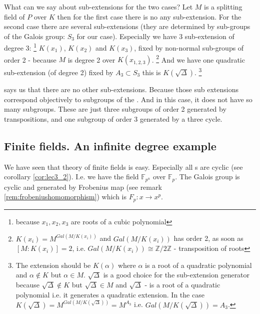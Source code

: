 \begin{example}
  What can we say about sub-extensions for the two cases? Let $M$ is a
  splitting field of $P$ over $K$ then for the first case there is no
  any sub-extension. For the second case there are several
  sub-extensions (they are determined by sub-groups of the Galois
  group: $S_3$ for our case). Especially we have 3 sub-extension of
  degree 3:
  \footnote{
    because $x_1, x_2, x_3$ are roots of a cubic polynomial
  }
  $K\left(x_1\right)$, $K\left(x_2\right)$ and
  $K\left(x_3\right)$, fixed by non-normal sub-groups of order 2 -
  because $M$ is degree 2 over $K\left(x_{1,2,3}\right)$.
  \footnote{
    $K\left(x_i\right) = M^{Gal\left(M/K\left(x_i\right)\right)}$ and
    $Gal\left(M/K\left(x_i\right)\right)$ has order 2, as soon as
    $\left[M:K\left(x_i\right)\right] = 2$,
    i.e.
    $Gal\left(M/K\left(x_i\right)\right) \cong \mathbb{Z}/2\mathbb{Z}$
    - transposition of roots
  }
  And we have
  one quadratic sub-extension 
  (of degree 2) fixed by $A_3 \subset S_3$ this is
  $K\left(\sqrt{\Delta}\right)$.
  \footnote{
    The extension should be $K\left(\alpha\right)$ where $\alpha$ is a
    root of a quadratic polynomial and $\alpha \notin
    K$ but $\alpha \in M$. $\sqrt{\Delta}$ is a good choice for the
    sub-extension 
    generator because $\sqrt{\Delta} \notin K$ but $\sqrt{\Delta} \in
    M$ and $\sqrt{\Delta}$ - is a root of a quadratic polynomial
    i.e. it generates a quadratic extension. In the case
    $K\left(\sqrt{\Delta}\right) =
    M^{Gal\left(M/K\left(\sqrt{\Delta}\right)\right)} = M^{A_3}$ i.e.
    $Gal\left(M/K\left(\sqrt{\Delta}\right)\right) = A_3$.
  }

   says us that there are no other
  sub-extensions. Because those sub extensions correspond objectively
  to subgroups of the . And in this case, it
  does not have so many subgroups. These are just three subgroups of order 2
  generated by transpositions, and one subgroup of order 3 generated
  by a three cycle.  
  \label{ex:lec6_discriminant3degree}
\end{example}

\subsection{Finite fields. An infinite degree example}
\label{sec:lec6_finitefield}
We have seen that theory of finite fields is easy. Especially all
s are cyclic (see corollary
\ref{cor:lec3_2}). I.e. we have the field $\mathbb{F}_{p^n}$ over
$\mathbb{F}_{p}$. The Galois group is cyclic and generated by
Frobenius map (see remark \ref{rem:frobeniushomomorphism}) which is
$F_p: x \to x^p$.

